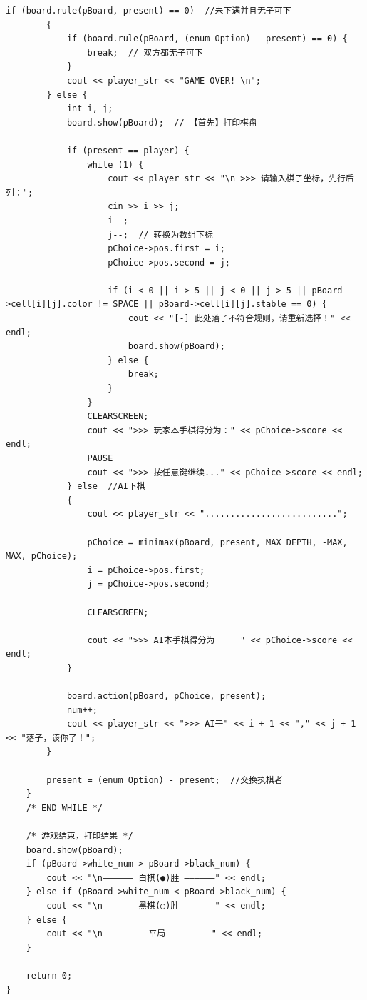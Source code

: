 \documentclass[a4paper, 11pt]{article}
\begin{document}
\begin{lstlisting}[title=main.cpp]
        if (board.rule(pBoard, present) == 0)  //未下满并且无子可下
        {
            if (board.rule(pBoard, (enum Option) - present) == 0) {
                break;  // 双方都无子可下
            }
            cout << player_str << "GAME OVER! \n";
        } else {
            int i, j;
            board.show(pBoard);  // 【首先】打印棋盘

            if (present == player) {
                while (1) {
                    cout << player_str << "\n >>> 请输入棋子坐标，先行后列：";
                    cin >> i >> j;
                    i--;
                    j--;  // 转换为数组下标
                    pChoice->pos.first = i;
                    pChoice->pos.second = j;

                    if (i < 0 || i > 5 || j < 0 || j > 5 || pBoard->cell[i][j].color != SPACE || pBoard->cell[i][j].stable == 0) {
                        cout << "[-] 此处落子不符合规则，请重新选择！" << endl;
                        board.show(pBoard);
                    } else {
                        break;
                    }
                }
                CLEARSCREEN;
                cout << ">>> 玩家本手棋得分为：" << pChoice->score << endl;
                PAUSE
                cout << ">>> 按任意键继续..." << pChoice->score << endl;
            } else  //AI下棋
            {
                cout << player_str << "..........................";

                pChoice = minimax(pBoard, present, MAX_DEPTH, -MAX, MAX, pChoice);
                i = pChoice->pos.first;
                j = pChoice->pos.second;

                CLEARSCREEN;

                cout << ">>> AI本手棋得分为     " << pChoice->score << endl;
            }

            board.action(pBoard, pChoice, present);
            num++;
            cout << player_str << ">>> AI于" << i + 1 << "," << j + 1 << "落子，该你了！";
        }

        present = (enum Option) - present;  //交换执棋者
    }
    /* END WHILE */

    /* 游戏结束，打印结果 */
    board.show(pBoard);
    if (pBoard->white_num > pBoard->black_num) {
        cout << "\n—————— 白棋(●)胜 ——————" << endl;
    } else if (pBoard->white_num < pBoard->black_num) {
        cout << "\n—————— 黑棋(○)胜 ——————" << endl;
    } else {
        cout << "\n———————— 平局 ————————" << endl;
    }

    return 0;
}
\end{lstlisting}
\end{document}
